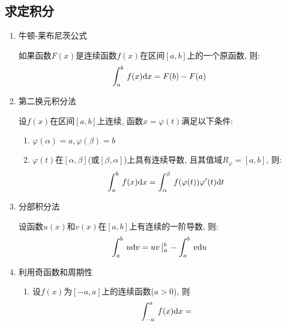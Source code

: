 \subsection{求定积分}
\begin{enumerate}
    \item 牛顿-莱布尼茨公式 \par 如果函数$ F(x) $是连续函数$ f(x) $在区间$ [a,b] $上的一个原函数, 则:
          \begin{equation*}
              \displaystyle\int_{a}^{b}\hspace{.2em}f(x)\mathrm{d}x=F(b)-F(a)
          \end{equation*}
    \item 第二换元积分法 \par 设$ f(x) $在区间$ [a,b] $上连续, 函数$ x=\varphi(t) $满足以下条件:
          \begin{enumerate}
              \item $ \varphi(\alpha)=a, \varphi(\beta)=b $
              \item $ \varphi(t) $在$ [\alpha,\beta] $(或$ [\beta,\alpha] $)上具有连续导数, 且其值域$ R_{\varphi}=[a,b] $, 则:
                    \begin{equation*}
                        \displaystyle\int_{a}^{b}\hspace{.2em}f(x)\mathrm{d}x=\displaystyle\int_{\alpha}^{\beta}\hspace{.2em}f(\varphi(t))\varphi'(t)\mathrm{d}t
                    \end{equation*}
          \end{enumerate}
    \item 分部积分法 \par 设函数$ u(x) $和$ v(x) $在$ [a,b] $上有连续的一阶导数, 则:
          \begin{equation*}
              \displaystyle\int_{a}^{b}\hspace{.2em}u \mathrm{d}v=uv\left|_{a}^{b}\right.-\displaystyle\int_{a}^{b}\hspace{.2em}v \mathrm{d}u
          \end{equation*}
    \item 利用奇函数和周期性
          \begin{enumerate}
              \item 设$ f(x) $为$ [-a,a] $上的连续函数($ a>0 $), 则
                    \begin{equation*}
                        \displaystyle\int_{-a}^{a}\hspace{.2em}f(x)\mathrm{d}x=

\end{equation*}
\end{enumerate}
\end{enumerate}
